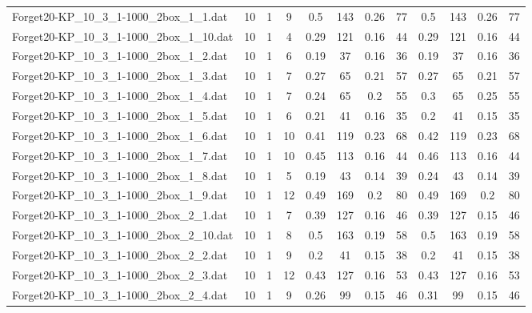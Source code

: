 \begin{sidewaystable}[!ht]
{\begin{tabular}{lccccccccccc}
Forget20-KP\_10\_3\_1-1000\_2box\_1\_1.dat & 10 & 1 & 9 & 0.5 & 143 &  \textcolor{blue2}{0.26} & 77 & 0.5 & 143 &  \textcolor{blue2}{0.26} & 77 \\
Forget20-KP\_10\_3\_1-1000\_2box\_1\_10.dat & 10 & 1 & 4 & 0.29 & 121 &  \textcolor{blue2}{0.16} & 44 & 0.29 & 121 &  \textcolor{blue2}{0.16} & 44 \\
Forget20-KP\_10\_3\_1-1000\_2box\_1\_2.dat & 10 & 1 & 6 & 0.19 & 37 &  \textcolor{blue2}{0.16} & 36 & 0.19 & 37 &  \textcolor{blue2}{0.16} & 36 \\
Forget20-KP\_10\_3\_1-1000\_2box\_1\_3.dat & 10 & 1 & 7 & 0.27 & 65 & 0.21 & 57 & 0.27 & 65 & 0.21 & 57 \\
Forget20-KP\_10\_3\_1-1000\_2box\_1\_4.dat & 10 & 1 & 7 & 0.24 & 65 &  \textcolor{blue2}{0.2} & 55 & 0.3 & 65 & 0.25 & 55 \\
Forget20-KP\_10\_3\_1-1000\_2box\_1\_5.dat & 10 & 1 & 6 & 0.21 & 41 & 0.16 & 35 & 0.2 & 41 &  \textcolor{blue2}{0.15} & 35 \\
Forget20-KP\_10\_3\_1-1000\_2box\_1\_6.dat & 10 & 1 & 10 & 0.41 & 119 &  \textcolor{blue2}{0.23} & 68 & 0.42 & 119 &  \textcolor{blue2}{0.23} & 68 \\
Forget20-KP\_10\_3\_1-1000\_2box\_1\_7.dat & 10 & 1 & 10 & 0.45 & 113 &  \textcolor{blue2}{0.16} & 44 & 0.46 & 113 &  \textcolor{blue2}{0.16} & 44 \\
Forget20-KP\_10\_3\_1-1000\_2box\_1\_8.dat & 10 & 1 & 5 & 0.19 & 43 &  \textcolor{blue2}{0.14} & 39 & 0.24 & 43 &  \textcolor{blue2}{0.14} & 39 \\
Forget20-KP\_10\_3\_1-1000\_2box\_1\_9.dat & 10 & 1 & 12 & 0.49 & 169 &  \textcolor{blue2}{0.2} & 80 & 0.49 & 169 &  \textcolor{blue2}{0.2} & 80 \\
Forget20-KP\_10\_3\_1-1000\_2box\_2\_1.dat & 10 & 1 & 7 & 0.39 & 127 & 0.16 & 46 & 0.39 & 127 &  \textcolor{blue2}{0.15} & 46 \\
Forget20-KP\_10\_3\_1-1000\_2box\_2\_10.dat & 10 & 1 & 8 & 0.5 & 163 &  \textcolor{blue2}{0.19} & 58 & 0.5 & 163 &  \textcolor{blue2}{0.19} & 58 \\
Forget20-KP\_10\_3\_1-1000\_2box\_2\_2.dat & 10 & 1 & 9 & 0.2 & 41 &  \textcolor{blue2}{0.15} & 38 & 0.2 & 41 &  \textcolor{blue2}{0.15} & 38 \\
Forget20-KP\_10\_3\_1-1000\_2box\_2\_3.dat & 10 & 1 & 12 & 0.43 & 127 &  \textcolor{blue2}{0.16} & 53 & 0.43 & 127 &  \textcolor{blue2}{0.16} & 53 \\
Forget20-KP\_10\_3\_1-1000\_2box\_2\_4.dat & 10 & 1 & 9 & 0.26 & 99 &  \textcolor{blue2}{0.15} & 46 & 0.31 & 99 &  \textcolor{blue2}{0.15} & 46 \\

\end{tabular}}
\end{sidewaystable}
